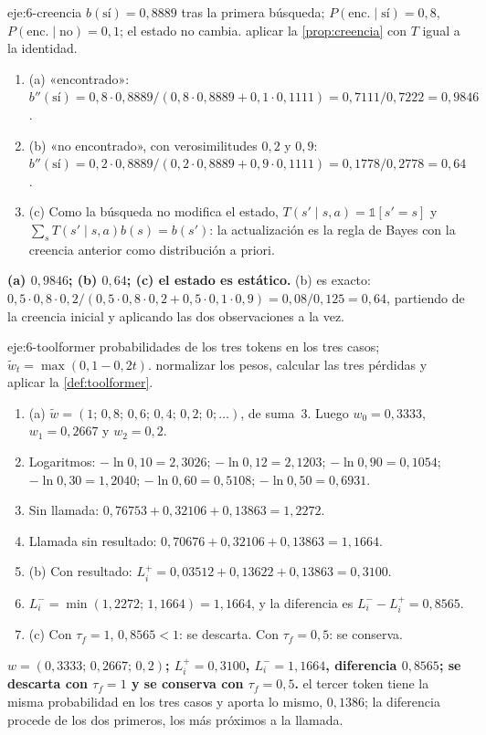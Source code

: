 \begin{solucion}{eje:6-creencia}
\datos $b(\text{sí})=0{,}8889$ tras la primera búsqueda; $P(\text{enc.}\mid\text{sí})=0{,}8$, $P(\text{enc.}\mid\text{no})=0{,}1$; el estado no cambia.
\planteamiento aplicar la \cref{prop:creencia} con $T$ igual a la identidad.
\pasos
\begin{enumerate}[label=\arabic*.]
  \item (a) «encontrado»: $b''(\text{sí})=0{,}8\cdot 0{,}8889/(0{,}8\cdot 0{,}8889+0{,}1\cdot 0{,}1111)=0{,}7111/0{,}7222=0{,}9846$.
  \item (b) «no encontrado», con verosimilitudes $0{,}2$ y $0{,}9$: $b''(\text{sí})=0{,}2\cdot 0{,}8889/(0{,}2\cdot 0{,}8889+0{,}9\cdot 0{,}1111)=0{,}1778/0{,}2778=0{,}64$.
  \item (c) Como la búsqueda no modifica el estado, $T(s'\mid s,a)=\mathbb{1}[s'=s]$ y $\sum_sT(s'\mid s,a)b(s)=b(s')$: la actualización es la regla de Bayes con la creencia anterior como distribución a priori.
\end{enumerate}
\resultado \textbf{(a) $0{,}9846$; (b) $0{,}64$; (c) el estado es estático.}
\comprobacion (b) es exacto: $0{,}5\cdot 0{,}8\cdot 0{,}2/(0{,}5\cdot 0{,}8\cdot 0{,}2+0{,}5\cdot 0{,}1\cdot 0{,}9)=0{,}08/0{,}125=0{,}64$, partiendo de la creencia inicial y aplicando las dos observaciones a la vez.
\end{solucion}

\begin{solucion}{eje:6-toolformer}
\datos probabilidades de los tres tokens en los tres casos; $\tilde w_t=\max(0,1-0{,}2t)$.
\planteamiento normalizar los pesos, calcular las tres pérdidas y aplicar la \cref{def:toolformer}.
\pasos
\begin{enumerate}[label=\arabic*.]
  \item (a) $\tilde w=(1;\,0{,}8;\,0{,}6;\,0{,}4;\,0{,}2;\,0;\dots)$, de suma~3. Luego $w_0=0{,}3333$, $w_1=0{,}2667$ y $w_2=0{,}2$.
  \item Logaritmos: $-\ln 0{,}10=2{,}3026$; $-\ln 0{,}12=2{,}1203$; $-\ln 0{,}90=0{,}1054$; $-\ln 0{,}30=1{,}2040$; $-\ln 0{,}60=0{,}5108$; $-\ln 0{,}50=0{,}6931$.
  \item Sin llamada: $0{,}76753+0{,}32106+0{,}13863=1{,}2272$.
  \item Llamada sin resultado: $0{,}70676+0{,}32106+0{,}13863=1{,}1664$.
  \item (b) Con resultado: $L_i^{+}=0{,}03512+0{,}13622+0{,}13863=0{,}3100$.
  \item $L_i^{-}=\min(1{,}2272;\,1{,}1664)=1{,}1664$, y la diferencia es $L_i^{-}-L_i^{+}=0{,}8565$.
  \item (c) Con $\tau_f=1$, $0{,}8565<1$: se descarta. Con $\tau_f=0{,}5$: se conserva.
\end{enumerate}
\resultado \textbf{$w=(0{,}3333;\,0{,}2667;\,0{,}2)$; $L_i^{+}=0{,}3100$, $L_i^{-}=1{,}1664$, diferencia $0{,}8565$; se descarta con $\tau_f=1$ y se conserva con $\tau_f=0{,}5$.}
\comprobacion el tercer token tiene la misma probabilidad en los tres casos y aporta lo mismo, $0{,}1386$; la diferencia procede de los dos primeros, los más próximos a la llamada.
\end{solucion}

